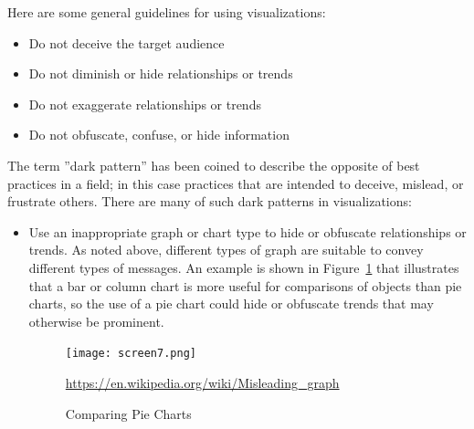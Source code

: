 Here are some general guidelines for using visualizations:
\begin{itemize}
   \item Do not deceive the target audience
   \item Do not diminish or hide relationships or trends
   \item Do not exaggerate relationships or trends
   \item Do not obfuscate, confuse, or hide information
\end{itemize}

The term ''dark pattern'' has been coined to describe the opposite of best practices in a field; in this case practices that are intended to deceive, mislead, or frustrate others. There are many of such dark patterns in visualizations:

\begin{itemize}
	\item Use an inappropriate graph or chart type to hide or obfuscate relationships or trends. As noted above, different types of graph are suitable to convey different types of messages. An example is shown in Figure~\ref{fig:comparingpies} that illustrates that a bar or column chart is more useful for comparisons of objects than pie charts, so the use of a pie chart could hide or obfuscate trends that may otherwise be prominent.
	
\begin{figure}
\centering
\texttt{[image: screen7.png]}

\scriptsize\url{https://en.wikipedia.org/wiki/Misleading_graph}
\caption{Comparing Pie Charts}
\label{fig:comparingpies}
\end{figure}


\end{itemize}
